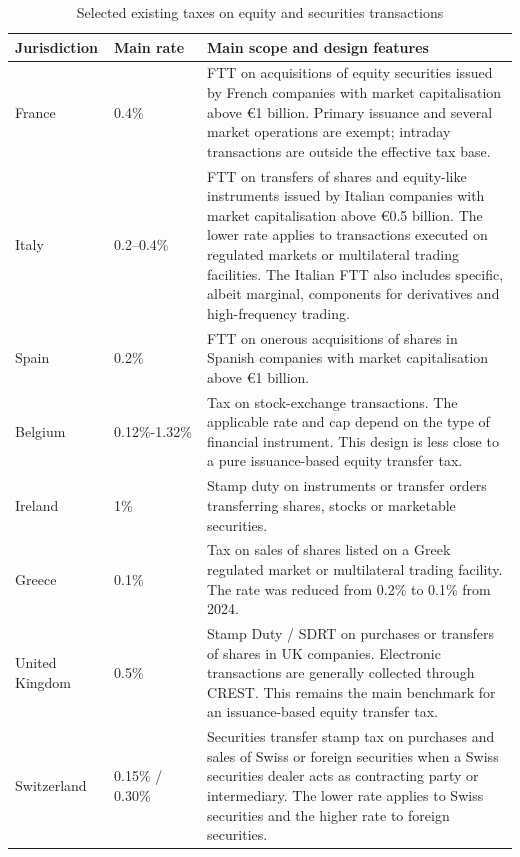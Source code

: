 \documentclass[../../main]{subfiles}
\begin{document}
\begin{table}[htbp]
\centering
\caption{Selected existing taxes on equity and securities transactions}
\label{tab:existing_ftt}
\footnotesize

\begin{tabularx}{\textwidth}{p{2.4cm} p{2.4cm} X}
\hline
Jurisdiction & Main rate & Main scope and design features \\
\hline

France & 0.4\% &
FTT on acquisitions of equity securities issued by French companies with market capitalisation above \euro{}1 billion. Primary issuance and several market operations are exempt; intraday transactions are outside the effective tax base. \\

Italy & 0.2--0.4\% &
FTT on transfers of shares and equity-like instruments issued by Italian companies with market capitalisation above \euro{}0.5 billion. The lower rate applies to transactions executed on regulated markets or multilateral trading facilities. The Italian FTT also includes specific, albeit marginal, components for derivatives and high-frequency trading. \\

Spain & 0.2\% &
FTT on onerous acquisitions of shares in Spanish companies with market capitalisation above \euro{}1 billion. \\

Belgium & 0.12\%-1.32\% &
Tax on stock-exchange transactions. The applicable rate and cap depend on the type of financial instrument. This design is less close to a pure issuance-based equity transfer tax. \\

Ireland & 1\% &
Stamp duty on instruments or transfer orders transferring shares, stocks or marketable securities. \\

Greece & 0.1\% &
Tax on sales of shares listed on a Greek regulated market or multilateral trading facility. The rate was reduced from 0.2\% to 0.1\% from 2024. \\

\hline 

United Kingdom & 0.5\% &
Stamp Duty / SDRT on purchases or transfers of shares in UK companies. Electronic transactions are generally collected through CREST. This remains the main benchmark for an issuance-based equity transfer tax. \\

Switzerland & 0.15\% / 0.30\% &
Securities transfer stamp tax on purchases and sales of Swiss or foreign securities when a Swiss securities dealer acts as contracting party or intermediary. The lower rate applies to Swiss securities and the higher rate to foreign securities. \\


\end{tabularx}
\end{table}
\end{document}
